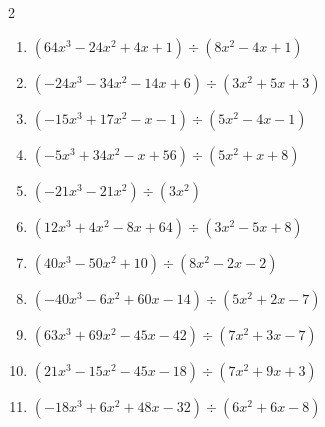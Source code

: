 \begin{multicols}{2}
\begin{enumerate}
        \phantom{$商 : -3x+3, \quad 剰余 : -2x-9$}

  \item $(64x^{3}-24x^{2}+4x+1) \div (8x^{2}-4x+1)$

        \phantom{$商 : 8x+1, \quad 剰余 : -4x-2$}

\columnbreak %

\resetques

  \item $(-24x^{3}-34x^{2}-14x+6) \div (3x^{2}+5x+3)$

        \phantom{$商 : -8x+2, \quad 剰余 : -2x-9$}

  \item $(-15x^{3}+17x^{2}-x-1) \div (5x^{2}-4x-1)$

        \phantom{$商 : -3x+1, \quad 剰余 : -8x$}

  \item $(-5x^{3}+34x^{2}-x+56) \div (5x^{2}+x+8)$

        \phantom{$商 : -x+7, \quad 剰余 : -3x+1$}

  \item $(-21x^{3}-21x^{2}) \div (3x^{2})$

        \phantom{$商 : -7x-7, \quad 剰余 : 9x-9$}

  \item $(12x^{3}+4x^{2}-8x+64) \div (3x^{2}-5x+8)$

        \phantom{$商 : 4x+8, \quad 剰余 : -5x+1$}

\columnbreak %

  \item $(40x^{3}-50x^{2}+10) \div (8x^{2}-2x-2)$

        \phantom{$商 : 5x-5, \quad 剰余 : 8x+1$}

  \item $(-40x^{3}-6x^{2}+60x-14) \div (5x^{2}+2x-7)$

        \phantom{$商 : -8x+2, \quad 剰余 : 6x+4$}

  \item $(63x^{3}+69x^{2}-45x-42) \div (7x^{2}+3x-7)$

        \phantom{$商 : 9x+6, \quad 剰余 : -9$}

  \item $(21x^{3}-15x^{2}-45x-18) \div (7x^{2}+9x+3)$

        \phantom{$商 : 3x-6, \quad 剰余 : x-4$}

  \item $(-18x^{3}+6x^{2}+48x-32) \div (6x^{2}+6x-8)$


\end{enumerate}
\end{multicols}
